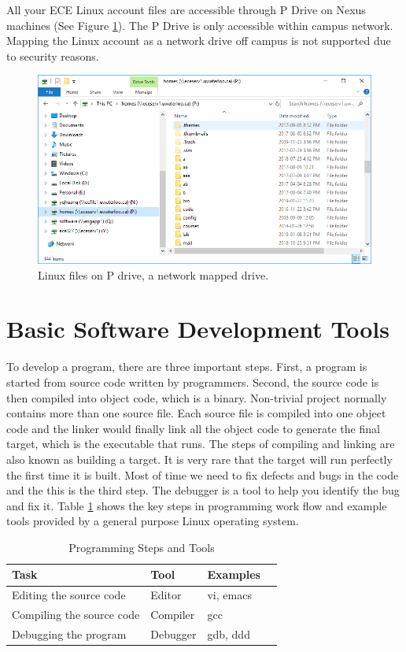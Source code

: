 All your ECE Linux account files are accessible through P Drive on Nexus machines (See Figure \ref{fig_lab0_P_Drive}). The P Drive is only accessible within campus network. Mapping the Linux account as a network drive off campus is not supported due to security reasons.
\begin{figure}[!htb]
  \centering
  \includegraphics[width=6in]{img/lab0/lab0_P_Drive}
  \caption{Linux files on P drive, a network mapped drive.}
  \label{fig_lab0_P_Drive}
\end{figure}

\section{Basic Software Development Tools}

To develop a program, there are three important steps.
First, a program is started from source code written by programmers. Second, the source code is then compiled into object code, which is a binary. Non-trivial project normally contains more than one source file. Each source file is compiled into one object code and the linker would finally link all the object code to generate the final target, which is the executable that runs. The steps of compiling and linking are also known as building a target. It is very rare that the target will run perfectly the first time it is built. Most of time we need to fix defects and bugs in the code and the this is the third step. The debugger is a tool to help you identify the bug and fix it. Table \ref{tb_prog_tools} shows the key steps in programming work flow and example tools provided by a general purpose Linux operating system.

\begin{table}[ht]
\begin{center}
\begin{tabular}{llll}
\hline
Task & Tool & Examples\\ \hline
Editing the source code &    Editor & vi, emacs \\  
Compiling the source code &  Compiler & gcc \\ 
Debugging the program	  &  Debugger & gdb, ddd \\ \hline 
\end{tabular}
\caption{Programming Steps and Tools}
\label{tb_prog_tools}
\end{center}
\end{table}

